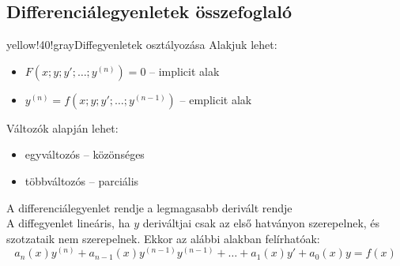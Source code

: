 \documentclass[main.tex]{subfiles}
\begin{document}
\subsection{Differenciálegyenletek összefoglaló}

\begin{cbox}{yellow!40!gray}{Diffegyenletek osztályozása}
  Alakjuk lehet:
  \begin{itemize}
    \item $F(x;y;y';\dots;y^{(n)}) = 0$
          \tabto{5.35cm} – \tabto{6cm} implicit alak

    \item $y^{(n)} = f(x;y;y';\dots;y^{(n-1)})$
          \tabto{5.35cm} – \tabto{6cm} emplicit alak
  \end{itemize}

  Változók alapján lehet:
  \begin{itemize}
    \item egyváltozós
          \tabto{2.6cm} – \tabto{3.2cm} közönséges

    \item többváltozós
          \tabto{2.6cm} – \tabto{3.2cm} parciális
  \end{itemize}

  A differenciálegyenlet rendje a legmagasabb derivált rendje
  \\[2mm]
  A diffegyenlet lineáris, ha $y$ deriváltjai csak az első
  hatványon szerepelnek, és szotzataik nem szerepelnek.
  Ekkor az alábbi alakban felírhatóak:
  \[
    a_n(x) y^{(n)}
    + a_{n-1}(x) y^{(n-1)} y^{(n-1)}
    + \dots
    + a_1(x) y'
    + a_0(x) y
    = f(x)
  \]
\end{cbox}
\end{document}
